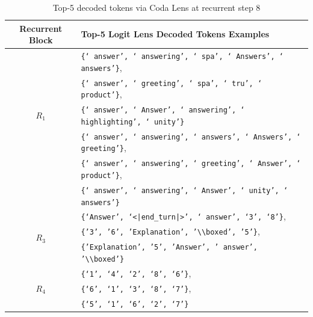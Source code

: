 \documentclass{article} %
\begin{document}
    \begin{table}[H]  %
        \centering
        \begin{tabularx}{\columnwidth}{|c|X|}
            \hline
            \textbf{Recurrent Block} & \textbf{Top-5 Logit Lens Decoded Tokens Examples} \\
            \hline
            \multirow{5}{*}{$R_1$} & \texttt{\{` answer', ` answering', ` spa', ` Answers', ` answers'\}},\\
            & \texttt{\{` answer', ` greeting', ` spa', ` tru', ` product'\}},\\
            & \texttt{\{` answer', ` Answer', ` answering', ` highlighting', ` unity'\}}\\
            \hline
            \multirow{6}{*}{$R_2$} & \texttt{\{` answer', ` answering', ` answers', ` Answers', ` greeting'\}},\\
            & \texttt{\{` answer', ` answering', ` greeting', ` Answer', ` product'\}},\\
            & \texttt{\{` answer', ` answering', ` Answer', ` unity', ` answers'\}}\\
            \hline
            \multirow{3}{*}{$R_3$} & \texttt{\{`Answer', `\texttt{\textless|end\_turn|\textgreater}', ` answer', `3', `8'\}},\\
            & \texttt{\{'3', '6', 'Explanation', '\texttt{\textbackslash\textbackslash boxed}', '5'\}},\\
            &\texttt{\{'Explanation', '5', 'Answer', ' answer', '\texttt{\textbackslash\textbackslash boxed}'\}}\\
            \hline
            \multirow{3}{*}{$R_4$}& \texttt{\{`1', `4', `2', `8', `6'\}}, \\
            & \texttt{\{`6', `1', `3', `8', `7'\}},\\
            & \texttt{\{`5', `1', `6', `2', `7'\}}\\
            \hline
        \end{tabularx}
        \caption{Top-5 decoded tokens via Coda Lens at recurrent step 8}
        \label{tab:coda-r8}
    \end{table}
\end{document}
